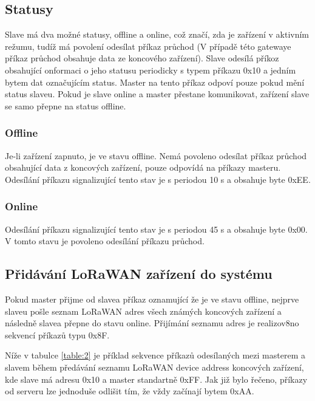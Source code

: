 \subsection{Statusy}
Slave má dva možné statusy, offline a online, což značí, zda je zařízení v aktivním režumu, tudíž má povolení odesílat příkaz průchod (V případě této gatewaye příkaz průchod obsahuje data ze koncového zařízení).  
Slave odesílá příkoz obsahující onformaci o jeho statusu periodicky s typem příkazu 0x10 a jedním bytem dat označujícím status. Master na tento příkaz odpoví pouze pokud mění status slaveu. Pokud je slave online a master přestane komunikovat, zařízení slave se samo přepne na status offline.

\subsubsection{Offline}
Je-li zařízení zapnuto, je ve stavu offline. Nemá povoleno odesílat příkaz průchod obsahující data z koncových zařízení, pouze odpovídá na příkazy masteru. Odesílání příkazu signalizující tento stav je s periodou 10 s a obsahuje byte 0xEE.

\subsubsection{Online}
Odesílání příkazu signalizující tento stav je s periodou 45 s a obsahuje byte 0x00.
V tomto stavu je povoleno odesílání příkazu průchod.


\subsection{Přidávání LoRaWAN zařízení do systému}
Pokud master přijme od slavea příkaz oznamující že je ve stavu offline, nejprve slaveu pošle seznam LoRaWAN adres všech známých koncových zařízení a následně slavea přepne do stavu online.
Přijímání seznamu adres je realizov8no sekvencí příkazů typu 0x8F. 

Níže v tabulce \ref{table:2} je příklad sekvence příkazů odesílaných mezi masterem a slavem během předávání seznamu LoRaWAN device address koncových zařízení, kde slave má adresu 0x10 a master standartně 0xFF. Jak již bylo řečeno, příkazy od serveru lze jednoduše odlišit tím, že vždy začínají bytem 0xAA.


